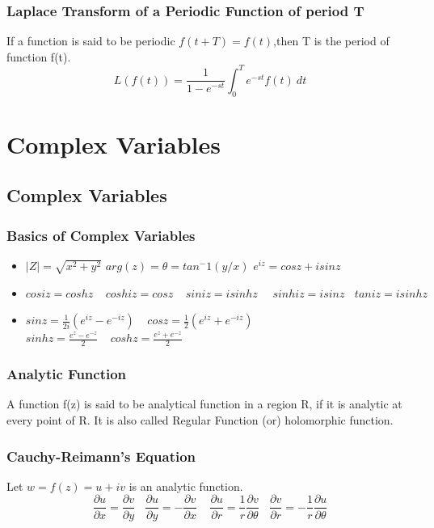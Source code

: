 \subsection*{Laplace Transform of a Periodic Function of period T}
If a function is said to be periodic \(f(t+T)=f(t)\),then T is the period of function f(t).
\[L\left(f(t)\right)=\frac{1}{1-e^{-st}}\int_0^Te^{-st}f(t)\ dt\]


\chapter*{Complex Variables}
\section{Complex Variables}

\subsection{Basics of Complex Variables}
\begin{itemize}
    \item \(|Z|=\sqrt{x^2+y^2}\)\hspace{1cm} \(arg(z)=\theta=tan^-1(y/x)\)\hspace{1cm} \(e^{iz} = cosz + i sinz\)
    \item \(cosiz = coshz\ \ \ \ \ coshiz=cosz\ \ \ \ \ siniz=isinhz\ \ \ \ \ \ sinhiz=isinz\ \ \ \ taniz=isinhz\)
    \item \(sinz=\frac{1}{2i}(e^{iz}-e^{-iz})\ \ \ \ \ cosz=\frac{1}{2}(e^{iz}+e^{-iz})\)\hspace{1cm} \(sinhz=\frac{e^{z}-e^{-z}}{2}\ \ \ \ \ coshz=\frac{e^{z}+e^{-z}}{2}\)
\end{itemize}

\subsection*{Analytic Function}
A function f(z) is said to be analytical function in a region R, if it is analytic at every point of R. It is also called Regular Function (or) holomorphic function.

\subsection*{Cauchy-Reimann's Equation}
Let \(w=f(z)=u+iv\) is an analytic function.
\[\frac{\partial u}{\partial x}=\frac{\partial v}{\partial y}\ \ \ \ \frac{\partial u}{\partial y}=-\frac{\partial v}{\partial x}\ \ \ \ \ \frac{\partial u}{\partial r}=\frac{1}{r}\frac{\partial v}{\partial \theta}\ \ \ \ \frac{\partial v}{\partial r}=-\frac{1}{r}\frac{\partial u}{\partial \theta} \]


